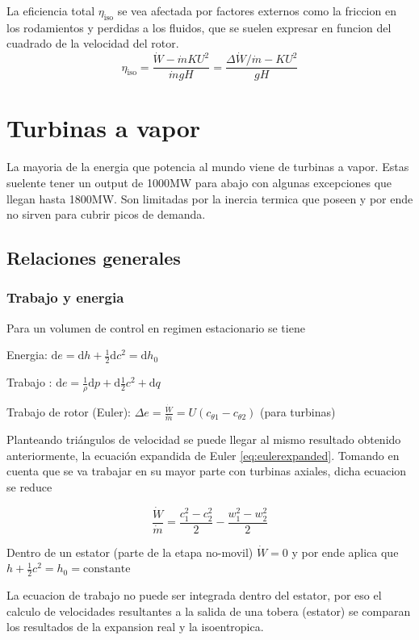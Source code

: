 \documentclass{article}
\newcommand{\substy}[2]{\ensuremath{{#1_{\mathrm{#2}}}}}
\newcommand{\ctan}[1]{\ensuremath{c_{\theta #1}}}
\newcommand{\di}{\textrm{d}}
\newcommand{\cte}{\textrm{constante}}
\newcommand{\dW}{\dot{W}}
\newcommand{\dm}{\dot{m}}
\newcommand{\etaTot}{\substy{\eta}{iso}}
\begin{document}
La eficiencia total $\etaTot$ se vea afectada por factores externos como la friccion en los rodamientos y perdidas a los fluidos, que se suelen expresar en funcion del cuadrado de la velocidad del rotor.
\[
\etaTot = \frac{\dot{W}-\dot{m}KU^2}{\dot{m}gH} = \frac{\Delta \dot{W}/\dot{m} - KU^2}{gH}
\]

\section{Turbinas a vapor}

La mayoria de la energia que potencia al mundo viene de turbinas a vapor. Estas suelente tener un output de 1000MW para abajo con algunas excepciones que llegan hasta 1800MW. Son limitadas por la inercia termica que poseen y por ende no sirven para cubrir picos de demanda. 

\subsection{Relaciones generales}

\subsubsection{Trabajo y energia}
Para un volumen de control en regimen estacionario se tiene

Energia: $\di e = \di h +\frac{1}{2} \di c^2 = \di h_0$

Trabajo : $\di e = \frac{1}{\rho} \di p + \di \frac{1}{2} c^2 + \di q$

Trabajo de rotor (Euler): $\Delta e = \frac{\dot{W}}{\dot{m}} = U(\ctan{1}-\ctan{2})$ (para turbinas)

Planteando triángulos de velocidad se puede llegar al mismo resultado obtenido anteriormente, la ecuación expandida de Euler \eqref{eq:eulerexpanded}. Tomando en cuenta que se va trabajar en su mayor parte con turbinas axiales, dicha ecuacion se reduce

\begin{equation} \label{eq:eulerexpandidaAxial}
    \frac{\dW}{\dm} = \frac{c_1^2-c_2^2}{2} - \frac{w_1^2-w_2^2}{2}
\end{equation}

Dentro de un estator (parte de la etapa no-movil) $\dW=0$ y por ende aplica que $h+\frac{1}{2} c^2 = h_0 = \cte$

La ecuacion de trabajo no puede ser integrada dentro del estator, por eso el calculo de velocidades resultantes a la salida de una tobera (estator) se comparan los resultados de la expansion real y la isoentropica. 
\end{document}
